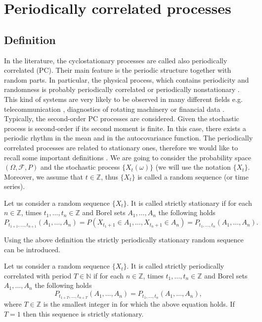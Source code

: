 \chapter{Periodically correlated processes}\label{chapt:PC_process}
\section{Definition}
In the literature, the cyclostationary processes are called also periodically correlated (PC). Their main feature is the periodic structure together with random parts. In particular, the physical process, which contains periodicity and randomness is probably periodically correlated or periodically nonstationary \cite{hurd2007periodically}. This kind of systems are very likely to be observed in many different fields \cite{gardner2006cyclostationarity} e.g. telecommunication \cite{napolitano2016cyclostationarity,wu1996blind}, diagnostics of rotating machinery \cite{randall2001relationship,capdessus2000cyclostationary} or financial data \cite{kruczek2017modified,broszkiewicz2004detecting}. Typically, the second-order PC processes are considered. Given the stochastic process is second-order if its second moment is finite. In this case, there exists a periodic rhythm in the mean and in the autocovariance function. The periodically correlated processes are related to stationary ones, therefore we would like to recall some important definitions \cite{hurd2007periodically}. We are going to consider the probability space $(\Omega,\mathcal{F},P)$ and the stochastic process  $\{X_t(\omega)\}$ (we will use the notation $\{X_t\}$. Moreover, we assume that $t\in \mathbb{Z}$, thus $\{X_t\}$ is called a random sequence (or time series). 
\begin{definition}\label{def1} \cite{hurd2007periodically} Let us consider a random sequence $\{X_t\}$. It is called strictly stationary if for each $n \in \mathbb{Z}$, times $t_1,\dots,t_n\in \mathbb{Z} $ and Borel sets $A_1,\dots ,A_n$ the following holds
\begin{equation}
  P_{t_{1+1},\dots,t_{n+1}}(A_1,\dots,A_n)=  P(X_{t_1+1}\in A_1,\dots ,X_{t_n+1}\in A_n)=P_{t_1,\dots,t_n}(A_1,\dots,A_n).
\end{equation}
\end{definition}
Using the above definition the strictly  periodically stationary random sequence can be introduced.
\begin{definition}\label{def2}\cite{hurd2007periodically}
Let us consider a random sequence $\{X_t\}$. It is called strictly  periodically correlated with period $T \in \mathbb{N}$  if for each $n \in \mathbb{Z}$, times $t_1,\dots,t_n \in \mathbb{Z} $ and Borel sets $A_1,\dots ,A_n$ the following holds
\begin{equation}
    P_{t_{1+T},\dots,t_{n+T}}(A_1,\dots,A_n)=P_{t_1,\dots,t_n}(A_1,\dots,A_n),
\end{equation}
where $T \in \mathbb{Z}$ is the smallest integer in for which the above equation holds. If $T=1$ then this sequence is  strictly stationary.
\end{definition}
